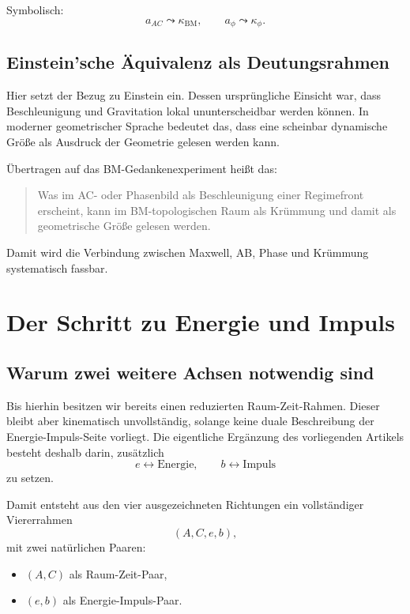 \documentclass[11pt,a4paper]{article}
\theoremstyle{definition}
\theoremstyle{plain}
\begin{document}
	Symbolisch:
	\[
	a_{AC}\leadsto \kappa_{\mathrm{BM}},
	\qquad
	a_\phi\leadsto \kappa_\phi.
	\]
	
	\subsection{Einstein’sche Äquivalenz als Deutungsrahmen}
	
	Hier setzt der Bezug zu Einstein ein. Dessen ursprüngliche Einsicht war, dass Beschleunigung und Gravitation lokal ununterscheidbar werden können. In moderner geometrischer Sprache bedeutet das, dass eine scheinbar dynamische Größe als Ausdruck der Geometrie gelesen werden kann.
	
	Übertragen auf das BM-Gedankenexperiment heißt das:
	\begin{quote}
		Was im AC- oder Phasenbild als Beschleunigung einer Regimefront erscheint, kann im BM-topologischen Raum als Krümmung und damit als geometrische Größe gelesen werden.
	\end{quote}
	
	Damit wird die Verbindung zwischen Maxwell, AB, Phase und Krümmung systematisch fassbar.
	
	\section{Der Schritt zu Energie und Impuls}
	
	\subsection{Warum zwei weitere Achsen notwendig sind}
	
	Bis hierhin besitzen wir bereits einen reduzierten Raum-Zeit-Rahmen. Dieser bleibt aber kinematisch unvollständig, solange keine duale Beschreibung der Energie-Impuls-Seite vorliegt. Die eigentliche Ergänzung des vorliegenden Artikels besteht deshalb darin, zusätzlich
	\[
	e \leftrightarrow \text{Energie},
	\qquad
	b \leftrightarrow \text{Impuls}
	\]
	zu setzen.
	
	Damit entsteht aus den vier ausgezeichneten Richtungen ein vollständiger Viererrahmen
	\[
	(A,C,e,b),
	\]
	mit zwei natürlichen Paaren:
	\begin{itemize}[leftmargin=2em]
		\item $(A,C)$ als Raum-Zeit-Paar,
		\item $(e,b)$ als Energie-Impuls-Paar.
	\end{itemize}
	
\end{document}
